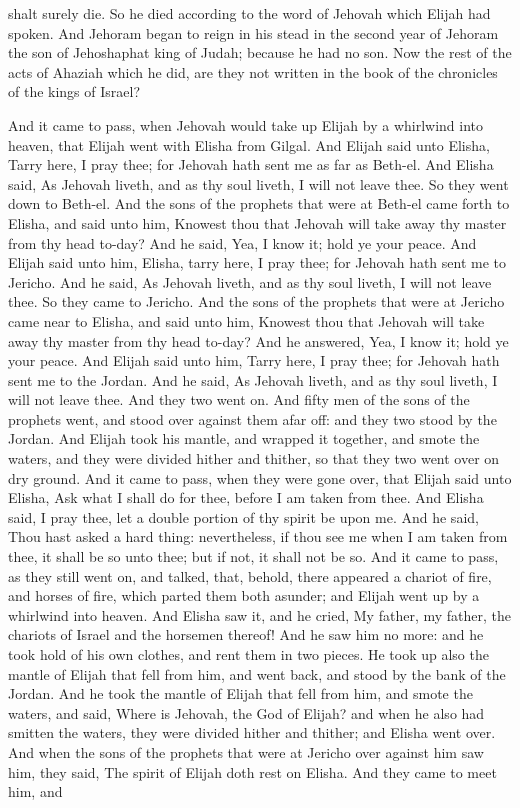 shalt surely die.  So he died according to the word of Jehovah which Elijah had spoken. And Jehoram began to reign in his stead in the second year of Jehoram the son of Jehoshaphat king of Judah; because he had no son. Now the rest of the acts of Ahaziah which he did, are they not written in the book of the chronicles of the kings of Israel? 

And it came to pass, when Jehovah would take up Elijah by a whirlwind into heaven, that Elijah went with Elisha from Gilgal. And Elijah said unto Elisha, Tarry here, I pray thee; for Jehovah hath sent me as far as Beth-el. And Elisha said, As Jehovah liveth, and as thy soul liveth, I will not leave thee. So they went down to Beth-el. And the sons of the prophets that were at Beth-el came forth to Elisha, and said unto him, Knowest thou that Jehovah will take away thy master from thy head to-day? And he said, Yea, I know it; hold ye your peace. And Elijah said unto him, Elisha, tarry here, I pray thee; for Jehovah hath sent me to Jericho. And he said, As Jehovah liveth, and as thy soul liveth, I will not leave thee. So they came to Jericho. And the sons of the prophets that were at Jericho came near to Elisha, and said unto him, Knowest thou that Jehovah will take away thy master from thy head to-day? And he answered, Yea, I know it; hold ye your peace. And Elijah said unto him, Tarry here, I pray thee; for Jehovah hath sent me to the Jordan. And he said, As Jehovah liveth, and as thy soul liveth, I will not leave thee. And they two went on. And fifty men of the sons of the prophets went, and stood over against them afar off: and they two stood by the Jordan. And Elijah took his mantle, and wrapped it together, and smote the waters, and they were divided hither and thither, so that they two went over on dry ground. And it came to pass, when they were gone over, that Elijah said unto Elisha, Ask what I shall do for thee, before I am taken from thee. And Elisha said, I pray thee, let a double portion of thy spirit be upon me. And he said, Thou hast asked a hard thing: nevertheless, if thou see me when I am taken from thee, it shall be so unto thee; but if not, it shall not be so. And it came to pass, as they still went on, and talked, that, behold, there appeared a chariot of fire, and horses of fire, which parted them both asunder; and Elijah went up by a whirlwind into heaven. And Elisha saw it, and he cried, My father, my father, the chariots of Israel and the horsemen thereof! And he saw him no more: and he took hold of his own clothes, and rent them in two pieces. He took up also the mantle of Elijah that fell from him, and went back, and stood by the bank of the Jordan. And he took the mantle of Elijah that fell from him, and smote the waters, and said, Where is Jehovah, the God of Elijah? and when he also had smitten the waters, they were divided hither and thither; and Elisha went over.  And when the sons of the prophets that were at Jericho over against him saw him, they said, The spirit of Elijah doth rest on Elisha. And they came to meet him, and 